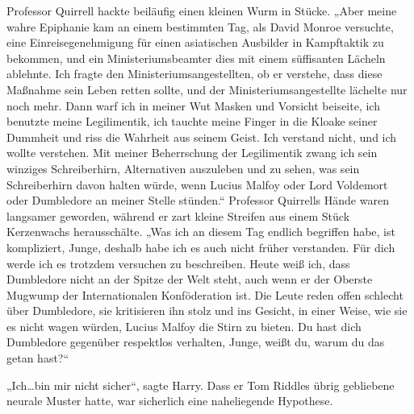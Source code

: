 Professor Quirrell hackte beiläufig einen kleinen Wurm in Stücke.
„Aber meine wahre Epiphanie kam an einem bestimmten Tag, als David Monroe versuchte, eine Einreisegenehmigung für einen asiatischen Ausbilder in Kampftaktik zu bekommen, und ein Ministeriumsbeamter dies mit einem süffisanten Lächeln ablehnte. Ich fragte den Ministeriumsangestellten, ob er verstehe, dass diese Maßnahme sein Leben retten sollte, und der Ministeriumsangestellte lächelte nur noch mehr. Dann warf ich in meiner Wut Masken und Vorsicht beiseite, ich benutzte meine Legilimentik, ich tauchte meine Finger in die Kloake seiner Dummheit und riss die Wahrheit aus seinem Geist. Ich verstand nicht, und ich wollte verstehen. Mit meiner Beherrschung der Legilimentik zwang ich sein winziges Schreiberhirn, Alternativen auszuleben und zu sehen, was sein Schreiberhirn davon halten würde, wenn Lucius Malfoy oder Lord Voldemort oder Dumbledore an meiner Stelle stünden.“
Professor Quirrells Hände waren langsamer geworden, während er zart kleine Streifen aus einem Stück Kerzenwachs herausschälte.
„Was ich an diesem Tag endlich begriffen habe, ist kompliziert, Junge, deshalb habe ich es auch nicht früher verstanden. Für dich werde ich es trotzdem versuchen zu beschreiben. Heute weiß ich, dass Dumbledore nicht an der Spitze der Welt steht, auch wenn er der Oberste Mugwump der Internationalen Konföderation ist. Die Leute reden offen schlecht über Dumbledore, sie kritisieren ihn stolz und ins Gesicht, in einer Weise, wie sie es nicht wagen würden, Lucius Malfoy die Stirn zu bieten. Du hast dich Dumbledore gegenüber respektlos verhalten, Junge, weißt du, warum du das getan hast?“

„Ich…bin mir nicht sicher“, sagte Harry.
Dass er Tom Riddles übrig gebliebene neurale Muster hatte, war sicherlich eine naheliegende Hypothese.

